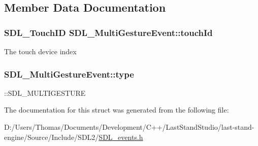 \subsection{Member Data Documentation}
\hypertarget{structSDL__MultiGestureEvent_aa15d1201559a3c9277082af71a972dc1}{}
\subsubsection[{touch\+Id}]{\setlength{\rightskip}{0pt plus 5cm}S\+D\+L\+\_\+\+Touch\+I\+D S\+D\+L\+\_\+\+Multi\+Gesture\+Event\+::touch\+Id}\label{structSDL__MultiGestureEvent_aa15d1201559a3c9277082af71a972dc1}
The touch device index \hypertarget{structSDL__MultiGestureEvent_ab0c7adc9a3f71cc3532bfe0ff8cc6120}{}
\subsubsection[{type}]{ S\+D\+L\+\_\+\+Multi\+Gesture\+Event\+::type}\label{structSDL__MultiGestureEvent_ab0c7adc9a3f71cc3532bfe0ff8cc6120}
\+::\+S\+D\+L\+\_\+\+M\+U\+L\+T\+I\+G\+E\+S\+T\+U\+R\+E 

The documentation for this struct was generated from the following file\+:\begin{DoxyCompactItemize}
\item 
D\+:/\+Users/\+Thomas/\+Documents/\+Development/\+C++/\+Last\+Stand\+Studio/last-\/stand-\/engine/\+Source/\+Include/\+S\+D\+L2/\hyperlink{SDL__events_8h}{S\+D\+L\+\_\+events.\+h}\end{DoxyCompactItemize}
